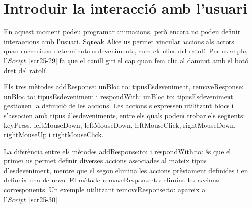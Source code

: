 \section{Introduir la interacció amb l'usuari}
En aquest moment podeu programar animacions, però encara no podeu definir interaccions amb l'usuari. Squeak Alice us permet vincular accions als actors quan succeeixen determinats esdeveniments, com els clics del ratolí. Per exemple, l'\emph{Script}~\ref{scr25-29} fa que el conill giri el cap quan fem clic al damunt amb el botó dret del ratolí.


Els tres mètodes \textsf{addResponse: unBloc to: tipusEsdeveniment}, \textsf{removeResponse: unBloc to: tipusEsdeveniment} i \textsf{respondWith: unBloc to: tipusEsdeveniment} gestionen la definició de les accions. Les accions s'expressen utilitzant blocs i s'associen amb tipus d'esdeveniments, entre els quals podem trobar els següents: \textsf{keyPress}, \textsf{leftMouseDown}, \textsf{leftMouseDown}, \textsf{leftMouseClick}, \textsf{rightMouseDown}, \textsf{rightMouseUp} i \textsf{rightMouseClick}.

La diferència entre els mètodes \textsf{addResponse:to:} i \textsf{respondWith:to:} és que el primer us permet definir diverses accions associades al mateix tipus d'esdeveniment, mentre que el segon elimina les accions prèviament definides i en defineix una de nova. El mètode \textsf{removeResponse:to:} elimina les accions corresponents. Un exemple utilitzant \textsf{removeResponse:to:} apareix a l'\emph{Script}~\ref{scr25-30}. 

